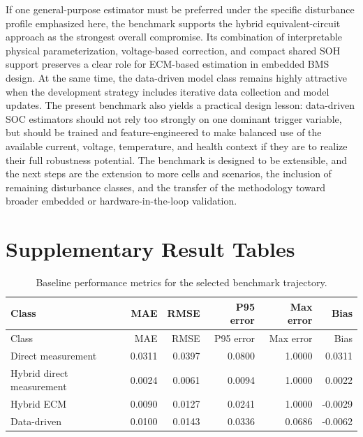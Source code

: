 \documentclass[review]{elsarticle}
\begin{document}
If one general-purpose estimator must be preferred under the specific disturbance profile emphasized here, the benchmark supports the hybrid equivalent-circuit approach as the strongest overall compromise. Its combination of interpretable physical parameterization, voltage-based correction, and compact shared SOH support preserves a clear role for ECM-based estimation in embedded BMS design. At the same time, the data-driven model class remains highly attractive when the development strategy includes iterative data collection and model updates. The present benchmark also yields a practical design lesson: data-driven SOC estimators should not rely too strongly on one dominant trigger variable, but should be trained and feature-engineered to make balanced use of the available current, voltage, temperature, and health context if they are to realize their full robustness potential. The benchmark is designed to be extensible, and the next steps are the extension to more cells and scenarios, the inclusion of remaining disturbance classes, and the transfer of the methodology toward broader embedded or hardware-in-the-loop validation.

\appendix
\section{Supplementary Result Tables}

\begin{longtable}{lrrrrr}
\caption{Baseline performance metrics for the selected benchmark trajectory.}\label{tab:appendix_baseline_metrics}\\
\toprule
Class & MAE & RMSE & P95 error & Max error & Bias \\
\midrule
\endfirsthead
\toprule
Class & MAE & RMSE & P95 error & Max error & Bias \\
\midrule
\endhead
Direct measurement & 0.0311 & 0.0397 & 0.0800 & 1.0000 & 0.0311 \\
Hybrid direct measurement & 0.0024 & 0.0061 & 0.0094 & 1.0000 & 0.0022 \\
Hybrid ECM & 0.0090 & 0.0127 & 0.0241 & 1.0000 & -0.0029 \\
Data-driven & 0.0100 & 0.0143 & 0.0336 & 0.0686 & -0.0062 \\
\bottomrule
\end{longtable}
\end{document}
